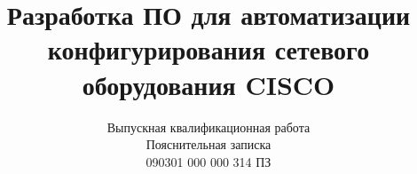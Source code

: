 \documentclass[utf8x, 14pt]{G7-32} %
\begin{document}
	
	\title{Разработка ПО для автоматизации конфигурирования сетевого оборудования CISCO}
	\subtitle{Выпускная квалификационная работа\\
		Пояснительная записка\\
		090301 000 000 314 ПЗ}
	\thispagestyle{empty}
	
	
\frontmatter %




  

\tableofcontents


%




\mainmatter %









%
%
%
%
%

\backmatter %





\appendix   %

%
%
%  
\end{document}
